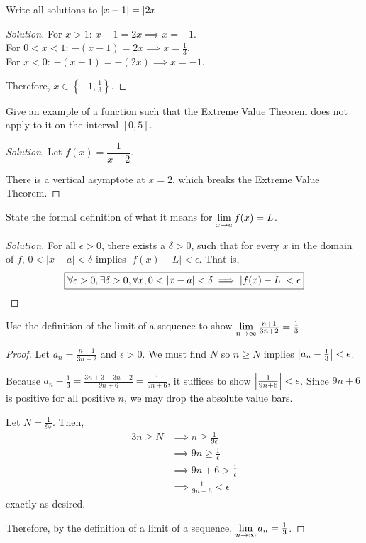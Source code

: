 \documentclass{agony}
\begin{document}
\question Write all solutions to $\abs{x-1} = \abs{2x}$
\begin{proof}[Solution]
  For $x > 1$: $x-1=2x \implies x=-1$. \\
  For $0 < x < 1$: $-(x-1)=2x \implies x=\frac13$. \\
  For $x < 0$: $-(x-1)=-(2x) \implies x=-1$.

  Therefore, $\boxed{x\in\left\{-1,\frac13\right\}}$.
\end{proof}

\question Give an example of a function such that the Extreme Value Theorem does not apply to it on the interval $[0,5]$.
\begin{proof}[Solution]
  Let $\boxed{f(x) = \dfrac{1}{x-2}}$.

  There is a vertical asymptote at $x=2$, which breaks the Extreme Value Theorem.
\end{proof}

\question State the formal \epsdel{} definition of what it means for $\lim\limits_{x\to a}f(x)=L$.
\begin{proof}[Solution]
  For all $\epsilon > 0$, there exists a $\delta > 0$, such that for every $x$ in the domain of $f$, $0 < |x-a| < \delta$ implies $|f(x)-L| < \epsilon$. That is,
  \[\boxed{\forall\epsilon>0,\exists\delta>0,\forall x,0<|x-a|<\delta\implies|f(x)-L|<\epsilon} \qedhere \]
\end{proof}



\question Use the \epsdel[N] definition of the limit of a sequence to show $\lim\limits_{n\to\infty} \frac{n+1}{3n+2}=\frac13$.
\begin{proof}
  Let $a_n=\frac{n+1}{3n+2}$ and $\epsilon > 0$.
  We must find $N$ so $n \geq N$ implies $\abs{a_n-\frac13}<\epsilon$.

  Because $a_n-\frac13=\frac{3n+3-3n-2}{9n+6}=\frac{1}{9n+6}$, it suffices to show $\abs{\frac1{9n+6}}<\epsilon$.
  Since $9n+6$ is positive for all positive $n$, we may drop the absolute value bars.

  Let $N = \frac{1}{9\epsilon}$. Then,
  \begin{alignat*}{3}
    n \geq N & \implies n \geq \frac{1}{9\epsilon} \\
             & \implies 9n \geq \frac{1}{\epsilon} \\
             & \implies 9n+6 > \frac{1}{\epsilon}  \\
             & \implies \frac{1}{9n+6} < \epsilon
  \end{alignat*}
  exactly as desired.

  Therefore, by the \epsdel[N] definition of a limit of a sequence, $\lim\limits_{n\to\infty}a_n=\frac13$.
\end{proof}
\end{document}
